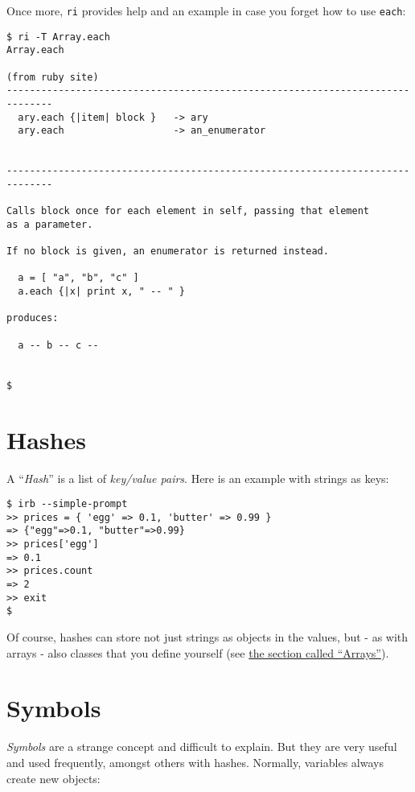 \documentclass[a4paper]{book}
\begin{document}
Once more, \texttt{ri} provides help and an example in case you forget how to use \texttt{each}:

\begin{shaded}\begin{verbatim}
$ ri -T Array.each
Array.each

(from ruby site)
------------------------------------------------------------------------------
  ary.each {|item| block }   -> ary
  ary.each                   -> an_enumerator


------------------------------------------------------------------------------

Calls block once for each element in self, passing that element
as a parameter.

If no block is given, an enumerator is returned instead.

  a = [ "a", "b", "c" ]
  a.each {|x| print x, " -- " }

produces:

  a -- b -- c --


$
\end{verbatim}\end{shaded}

\section{Hashes}\label{hashes}

A “\emph{Hash}” is a list of \emph{key/value pairs}. Here is an example with strings as keys:

\begin{shaded}\begin{verbatim}
$ irb --simple-prompt
>> prices = { 'egg' => 0.1, 'butter' => 0.99 }
=> {"egg"=>0.1, "butter"=>0.99}
>> prices['egg']
=> 0.1
>> prices.count
=> 2
>> exit
$
\end{verbatim}\end{shaded}

Of course, hashes can store not just strings as objects in the values, but - as with arrays - also classes that you define yourself (see \hyperref[rubyux5farray]{the section called “Arrays”}).

\section{Symbols}\label{symbols}

\emph{Symbols} are a strange concept and difficult to explain. But they are very useful and used frequently, amongst others with hashes. Normally, variables always create new objects:
\end{document}
